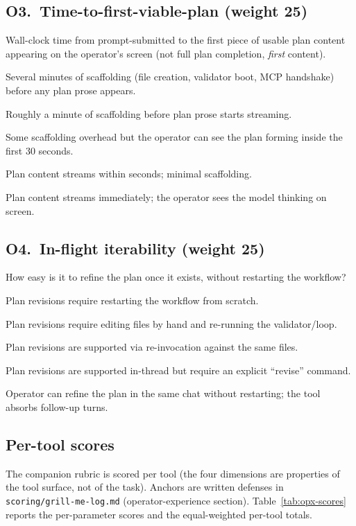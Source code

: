 \subsection*{O3.\ Time-to-first-viable-plan (weight 25)}
Wall-clock time from prompt-submitted to the first piece of usable
plan content appearing on the operator's screen (not full plan
completion, \emph{first} content).
\begin{description}[leftmargin=11mm, labelindent=0mm]
\item[1] Several minutes of scaffolding (file creation, validator
boot, MCP handshake) before any plan prose appears.
\item[2] Roughly a minute of scaffolding before plan prose starts
streaming.
\item[3] Some scaffolding overhead but the operator can see the plan
forming inside the first 30 seconds.
\item[4] Plan content streams within seconds; minimal scaffolding.
\item[5] Plan content streams immediately; the operator sees the
model thinking on screen.
\end{description}

\subsection*{O4.\ In-flight iterability (weight 25)}
How easy is it to refine the plan once it exists, without restarting
the workflow?
\begin{description}[leftmargin=11mm, labelindent=0mm]
\item[1] Plan revisions require restarting the workflow from scratch.
\item[2] Plan revisions require editing files by hand and re-running
the validator/loop.
\item[3] Plan revisions are supported via re-invocation against the
same files.
\item[4] Plan revisions are supported in-thread but require an
explicit ``revise'' command.
\item[5] Operator can refine the plan in the same chat without
restarting; the tool absorbs follow-up turns.
\end{description}

\subsection*{Per-tool scores}

The companion rubric is scored per tool (the four dimensions are
properties of the tool surface, not of the task). Anchors are written
defenses in \texttt{scoring/grill-me-log.md} (operator-experience
section). Table~\ref{tab:opx-scores} reports the per-parameter scores
and the equal-weighted per-tool totals.

